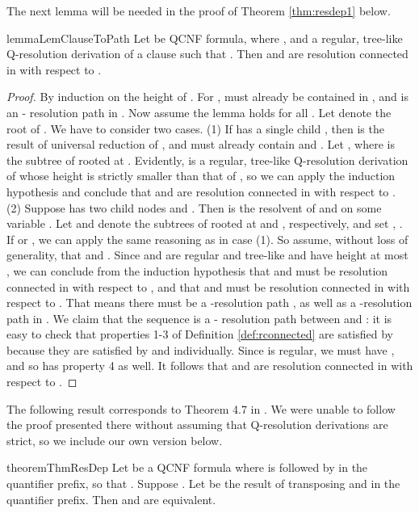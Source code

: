 \documentclass{llncs}
\newcommand{\longversion}[1]{#1}
\newcommand{\shortversion}[1]{}
\def\hy{\hbox{-}\nobreak\hskip0pt} \newcommand{\ellipsis}{}
\begin{document}
The next lemma will be needed in the proof of Theorem \ref{thm:resdep1} below.
\begin{restatable}{lemma}{LemClauseToPath}\label{lem:ClauseToPath}\shortversion{\textup{()}}
  Let  be QCNF formula,  where , and  a regular, tree-like Q-resolution derivation
  of a clause  such that . Then  and  are
  resolution connected in  with respect to .
\end{restatable}
\longversion{\begin{proof} By induction on the height  of . For ,  must
  already be contained in , and  is an \hy
  resolution path in . Now assume the lemma holds for all . Let  denote the root of . We have to consider two
  cases. (1) If  has a single child , then  is the
  result of universal reduction of , and  must already
  contain  and . Let , where  is the
  subtree of  rooted at . Evidently,  is a regular, tree\hy like
  Q\hy resolution derivation of  whose height is strictly smaller
  than that of , so we can apply the induction hypothesis and conclude
  that  and  are resolution connected in  with respect to
  .  (2) Suppose  has
  two child nodes  and . Then  is the resolvent of
   and  on some variable . Let  and  denote the subtrees of  rooted at 
  and , respectively, and set , . If  or , we can apply the same reasoning as in case (1). So assume,
  without loss of generality, that  and . Since  and  are regular and tree-like and
  have height at most , we can conclude from the induction hypothesis
  that  and  must be resolution connected in  with respect to
  , and that  and  must be resolution
  connected in  with respect to . That means
  there must be a \hy resolution path , as well as a
  \hy resolution path  in . We claim that the
  sequence \hskip 0pt is a \hy
  resolution path between  and : it is easy to check that
  properties 1-3 of Definition \ref{def:rconnected} are satisfied by 
  because they are satisfied by  and  individually. Since  is
  regular, we must have , and so  has property
  4 as well. It follows that  and  are resolution connected in
   with respect to .
\end{proof}
 } The following result corresponds to
Theorem 4.7 in \cite{VanGelder11}.  \longversion{We were unable to follow the
  proof presented there without assuming that Q\hy resolution derivations are
  strict, so we include our own version below.}
\begin{restatable}{theorem}{ThmResDep}\label{thm:resdep1}\shortversion{\textup{()}}
  Let  be a QCNF formula where  is followed by  in
  the quantifier prefix, so that . Suppose . Let  be the result of
  transposing  and  in the quantifier prefix. Then
   and  are equivalent.
\end{restatable}
\end{document}
